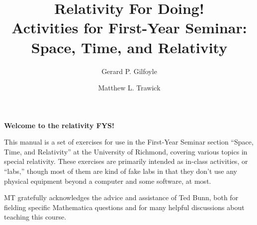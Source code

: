 

\title{Relativity For Doing!\\
Activities for First-Year Seminar: Space, Time, and Relativity}

\author{Gerard P. Gilfoyle}
\author{Matthew L. Trawick}

\maketitle

\vspace{0.8 in}


\begin{center}
\large{\textbf{Welcome to the relativity FYS!}}
\end{center}


This manual is a set of exercises for use in the First-Year Seminar section ``Space, Time, and Relativity'' at the University of Richmond, covering various topics in special relativity.  These exercises are primarily intended as in-class activities, or ``labs,'' though most of them are kind of fake labs in that they don't use any physical equipment beyond a computer and some software, at most.

MT gratefully acknowledges the advice and assistance of Ted Bunn, both for fielding specific Mathematica questions and for many helpful discussions about teaching this course.



\newpage
\
\thispagestyle{plain}

\newpage
\
